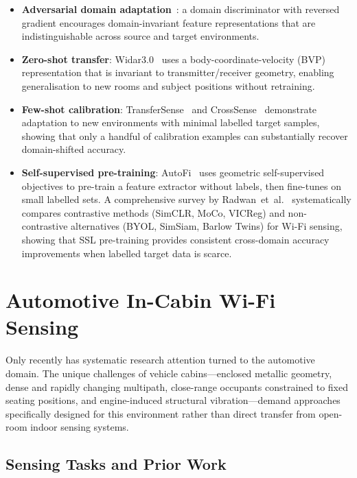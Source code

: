 \documentclass[english,bibtex]{kththesis}
\begin{document}
\begin{itemize}
  \item \textbf{Adversarial domain adaptation}~\cite{zou2018robust,yang2020mobileda}: a domain discriminator with reversed gradient encourages domain-invariant feature representations that are indistinguishable across source and target environments.
  \item {}\textbf{Zero-shot transfer}: Widar3.0~\cite{zhang2021widar3} uses a body-coordinate-velocity (BVP) representation that is invariant to transmitter/receiver geometry, enabling generalisation to new rooms and subject positions without retraining.
  \item \textbf{Few-shot calibration}: TransferSense~\cite{bu2021transfersense} and CrossSense~\cite{zhang2018crosssense} demonstrate adaptation to new environments with minimal labelled target samples, showing that only a handful of calibration examples can substantially recover domain-shifted accuracy.
  \item {}\textbf{Self-supervised pre-training}: AutoFi~\cite{yang2022autofi} uses geometric self-supervised objectives to pre-train a feature extractor without labels, then fine-tunes on small labelled sets. A comprehensive survey by Radwan~et~al.~\cite{radwan2026ssl} systematically compares contrastive methods (SimCLR, MoCo, VICReg) and non-contrastive alternatives (BYOL, SimSiam, Barlow Twins) for Wi-Fi sensing, showing that SSL pre-training provides consistent cross-domain accuracy improvements when labelled target data is scarce.
\end{itemize}

\section{Automotive In-Cabin Wi-Fi Sensing}
\label{sec:incabin}

Only recently has systematic research attention turned to the automotive domain. The unique challenges of vehicle cabins---enclosed metallic geometry, dense and rapidly changing multipath, close-range occupants constrained to fixed seating positions, and engine-induced structural vibration---demand approaches specifically designed for this environment rather than direct transfer from open-room indoor sensing systems.

\subsection{Sensing Tasks and Prior Work}
\label{sec:incabin-tasks}
\end{document}
